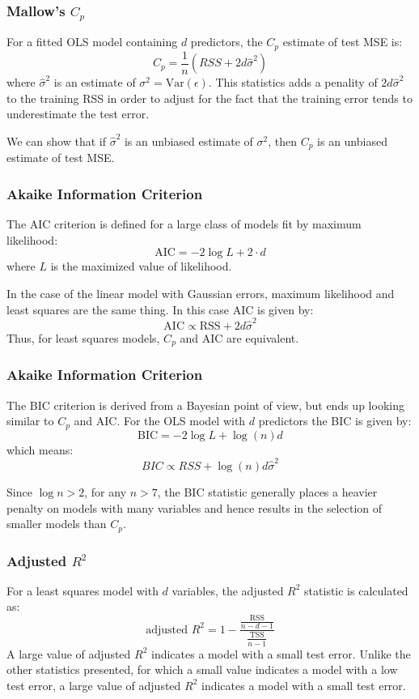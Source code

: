 \subsubsection*{Mallow's $C_p$}
For a fitted OLS model containing $d$ predictors, the $C_p$ estimate of test MSE is:
\[
    C_p = \frac{1}{n} \left(RSS + 2d\hat{\sigma}^2\right)
\]
where $\hat{\sigma}^2$ is an estimate of $\sigma^2 = \text{Var}(\epsilon)$. This statistics adds a penality of $2d\hat{\sigma}^2$ to the training RSS in order to adjust for the fact that the training error tends to underestimate the test error.

We can show that if $\hat{\sigma}^2$ is an unbiased estimate of $\sigma^2$, then $C_p$ is an unbiased estimate of test MSE.

\subsubsection*{Akaike Information Criterion}
The AIC criterion is defined for a large class of models fit by maximum likelihood:
\[
    \text{AIC} = -2\log L + 2 \cdot d
\]
where $L$ is the maximized value of likelihood.

In the case of the linear model with Gaussian errors, maximum likelihood and least squares are the same thing. In this case AIC is given by:
\[
    \text{AIC} \propto \text{RSS} + 2d\hat{\sigma}^2
\]
Thus, for least squares models, $C_p$ and AIC are equivalent.

\subsubsection*{Akaike Information Criterion}
The BIC criterion is derived from a Bayesian point of view, but ends up looking similar to $C_p$ and AIC. For the OLS model with $d$ predictors the BIC is given by:
\[
    \text{BIC} = - 2 \log L + \log(n) d
\]
which means:
\[
    BIC \propto RSS + \log (n)d \hat{\sigma}^2
\]

Since $\log n > 2$, for any $n > 7$, the BIC statistic generally places a heavier penalty on models with many variables and hence results in the selection of smaller models than $C_p$.

\subsubsection*{Adjusted $R^2$}
For a least squares model with $d$ variables, the adjusted $R^2$ statistic is calculated as:
\[
    \text{adjusted } R^2 = 1 - \frac{\frac{\text{RSS}}{n-d-1}}{\frac{\text{TSS}}{n-1}}
\]
A large value of adjusted $R^2$ indicates a model with a small test error.
Unlike the other statistics presented, for which a small value indicates a model with a low test error, a large value of adjusted $R^2$ indicates a model with a small test error.


